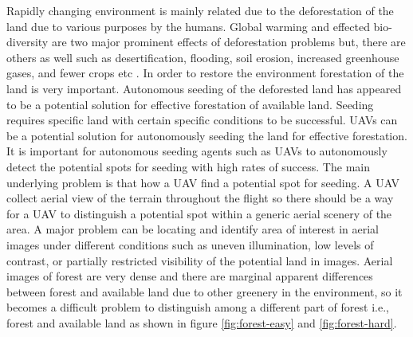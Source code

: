 \documentclass[rnd]{mas_proposal}
\begin{document}
Rapidly changing environment is mainly related due to the deforestation of the land due to various purposes by the humans. Global warming and effected bio-diversity are two major prominent 
effects of deforestation problems but, there are others as well such as desertification, flooding, soil erosion, increased greenhouse gases, and fewer crops etc \cite{Effectso52:online}. 
In order to restore the environment forestation of the land is very important. Autonomous seeding of the deforested land has appeared to be a potential solution for effective forestation of available land. 
 Seeding requires specific land with certain specific conditions to be successful. UAVs can be a potential solution for autonomously seeding the land for effective forestation. 
It is important for autonomous seeding agents such as UAVs to autonomously detect the potential spots for seeding with high rates of success. The main underlying problem is that how a UAV 
find a potential spot for seeding. A UAV collect aerial view of the terrain throughout the flight so there should be a way for a UAV to distinguish a potential spot within a generic aerial 
scenery of the area. A major problem can be locating and identify area of interest in aerial images under different conditions such as uneven illumination, low levels of contrast, or partially 
restricted visibility of the potential land in images. Aerial images of forest are very dense and there are marginal apparent differences between forest and available land due to 
other greenery in the environment, so it becomes a difficult problem to distinguish among a different part of forest i.e., forest and available land as shown in figure \ref{fig:forest-easy} and \ref{fig:forest-hard}.
\end{document}
